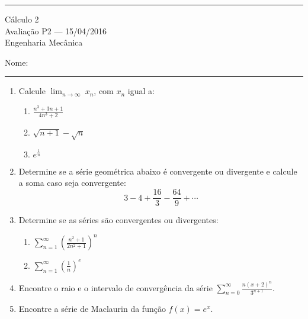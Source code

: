 \documentclass{article}
\newcommand{\ds}{\displaystyle}
\begin{document}
\noindent{}\rule{\textwidth}{0.4pt}
\begin{center}
	C\'alculo 2\\
	Avalia\c{c}\~ao P2 --- 15/04/2016 \\
	Engenharia Mec\^anica \\
	\vspace{0.2cm}
\end{center}
Nome: \\
\noindent{}\rule{\textwidth}{0.4pt}

\begin{enumerate}
\item Calcule $\displaystyle\lim_{n\rightarrow\infty}\ x_n$, com $x_n$ igual a:
	\begin{enumerate}
		\item $\ds\frac{n^3+3n+1}{4n^3+2}$
		\item $\sqrt{n+1}-\sqrt{n}$
		\item $e^{\frac{1}{n}}$
	\end{enumerate}

\item Determine se a s\'erie geom\'etrica abaixo \'e convergente ou divergente e calcule a soma caso seja convergente:
$$\ds3-4+\frac{16}{3}-\frac{64}{9}+\cdots$$

\item Determine se as s\'eries s\~ao convergentes ou divergentes:
	\begin{enumerate}
		\item $\ds\sum_{n=1}^\infty \left(\frac{n^2+1}{2n^2+1}\right)^n$
		\item $\ds\sum_{n=1}^\infty \left(\frac{1}{n}\right)^e$
	\end{enumerate}

\item Encontre o raio e o intervalo de converg\^encia da s\'erie
$\ds\sum_{n=0}^\infty \frac{n(x+2)^n}{3^{n+1}}$.

\item Encontre a s\'erie de Maclaurin da fun\c{c}\~ao $f(x) = e^x$.
	
\end{enumerate}
\end{document}
